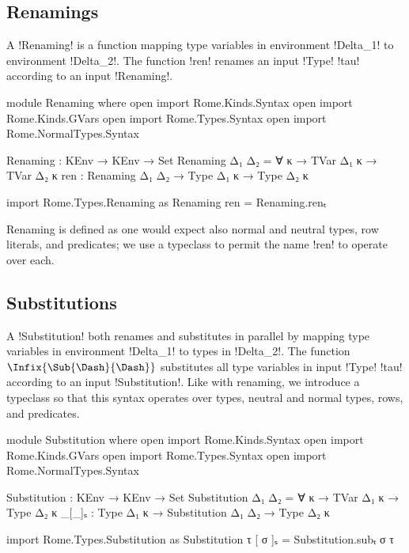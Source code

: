 \subsection{Renamings}

A !Renaming! is a function mapping type variables in environment !Delta_1! to environment !Delta_2!. The function !ren! renames an input !Type! !tau! according to an input !Renaming!.

\begin{AgdaAlign}
\begin{code}[hide]
module Renaming where
  open import Rome.Kinds.Syntax
  open import Rome.Kinds.GVars
  open import Rome.Types.Syntax 
  open import Rome.NormalTypes.Syntax
\end{code}
\begin{code}
  Renaming : KEnv → KEnv → Set
  Renaming Δ₁ Δ₂ = ∀ {κ} → TVar Δ₁ κ → TVar Δ₂ κ
  ren : Renaming Δ₁ Δ₂ → Type Δ₁ κ → Type Δ₂ κ
\end{code}
\begin{code}[hide]
  import Rome.Types.Renaming as Renaming
  ren = Renaming.renₜ
\end{code}
\end{AgdaAlign}

Renaming is defined as one would expect also normal and neutral types, row literals, and predicates; we use a typeclass to permit the name !ren! to operate over each.

\subsection{Substitutions} 

A !Substitution! both renames and substitutes in parallel by mapping type variables in environment !Delta_1! to types in !Delta_2!. The function $\Infix{\Sub{\Dash}{\Dash}}$ substitutes all type variables in input !Type! !tau! according to an input !Substitution!. Like with renaming, we introduce a typeclass so that this syntax operates over types, neutral and normal types, rows, and predicates.

\begin{AgdaAlign}
\begin{code}[hide]
module Substitution where
  open import Rome.Kinds.Syntax
  open import Rome.Kinds.GVars
  open import Rome.Types.Syntax 
  open import Rome.NormalTypes.Syntax
\end{code}
\begin{code}
  Substitution : KEnv → KEnv → Set
  Substitution Δ₁ Δ₂ = ∀ {κ} → TVar Δ₁ κ → Type Δ₂ κ
  _[_]ₛ : Type Δ₁ κ → Substitution Δ₁ Δ₂ → Type Δ₂ κ
\end{code}
\begin{code}[hide]
  import Rome.Types.Substitution as Substitution 
  τ [ σ ]ₛ = Substitution.subₜ σ τ
\end{code}
\end{AgdaAlign}

